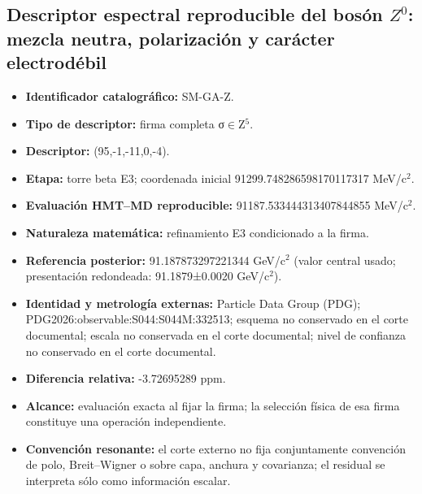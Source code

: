 \subsection{Descriptor espectral reproducible del bosón \(Z^0\): mezcla neutra, polarización y carácter electrodébil}
\begin{itemize}
\item \textbf{Identificador catalográfico:} SM-GA-Z.
\item \textbf{Tipo de descriptor:} firma completa σ\(\in\)Z\({}^{5}\).
\item \textbf{Descriptor:} (95,-1,-11,0,-4).
\item \textbf{Etapa:} torre beta E3; coordenada inicial 91299.748286\allowbreak{}598170\allowbreak{}117317 MeV/c\({}^{2}\).
\item \textbf{Evaluación HMT--MD reproducible:} 91187.533444\allowbreak{}313407\allowbreak{}844855 MeV/c\({}^{2}\).
\item \textbf{Naturaleza matemática:} refinamiento E3 condicionado a la firma.
\item \textbf{Referencia posterior:} 91.187873\allowbreak{}297221\allowbreak{}344 GeV/c\({}^{2}\) (valor central usado; presentación redondeada: 91.1879±\allowbreak{}0.0020 GeV/c\({}^{2}\)).
\item \textbf{Identidad y metrología externas:} Particle Data Group (PDG); PDG2026:\allowbreak{}observable:\allowbreak{}S044:\allowbreak{}S044M:\allowbreak{}332513; esquema no conservado en el corte documental; escala no conservada en el corte documental; nivel de confianza no conservado en el corte documental.
\item \textbf{Diferencia relativa:} -3.726952\allowbreak{}89 ppm.
\item \textbf{Alcance:} evaluación exacta al fijar la firma; la selección física de esa firma constituye una operación independiente.
\item \textbf{Convención resonante:} el corte externo no fija conjuntamente convención de polo, Breit--Wigner o sobre capa, anchura y covarianza; el residual se interpreta sólo como información escalar.
\end{itemize}
